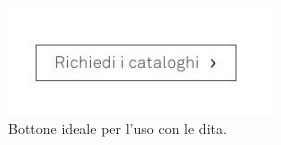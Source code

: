 \begin{figure}[H]
	\centering
	\includegraphics[width=7cm,keepaspectratio]{sez/HomePage/img/mobile-button.jpg}
	\caption[https://www.caccaro.com/]{Bottone ideale per l'uso con le dita.}
	\label{fig:mobButton}
\end{figure}
